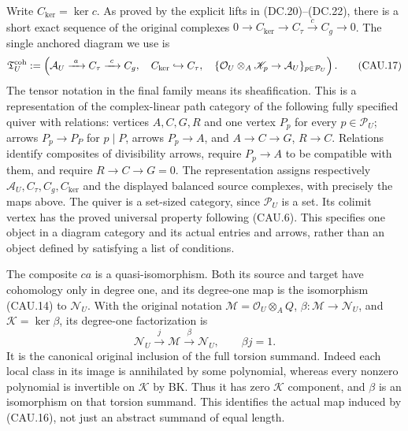 Write $C_{\ker}=\ker c$.  As proved by the explicit lifts in (DC.20)--(DC.22),
there is a short exact sequence of the original complexes
$0\to C_{\ker}\to C_\tau\xrightarrow c C_g\to0$.
The single anchored diagram we use is
\[
 \mathfrak T_U^{\rm coh}:=
 \left(
 \mathcal A_U\xrightarrow{\ a\ }C_\tau\xrightarrow{\ c\ }C_g,
 \quad C_{\ker}\hookrightarrow C_\tau,
 \quad \{\mathcal O_U\otimes_A\mathscr K_p\to\mathcal A_U\}_{p\in\mathcal P_U}
 \right).                                                    \tag{CAU.17}
\]
The tensor notation in the final family means its sheafification.
This is a representation of the complex-linear path category of the
following fully specified quiver with relations: vertices $A,C,G,R$
and one vertex $P_p$ for every
$p\in\mathcal P_U$; arrows $P_p\to P_P$ for $p\mid P$, arrows
$P_p\to A$, and $A\to C\to G$, $R\to C$.  Relations identify
composites of divisibility arrows, require $P_p\to A$ to be compatible
with them, and require $R\to C\to G=0$.  The representation assigns
respectively $\mathcal A_U,C_\tau,C_g,C_{\ker}$ and the displayed
balanced source complexes, with precisely the maps above.  The quiver
is a set-sized category, since $\mathcal P_U$ is a set.  Its colimit
vertex has the proved universal property following (CAU.6).  This
specifies one object in a diagram category and its actual entries and
arrows, rather than an object defined by satisfying a list of conditions.

The composite $ca$ is a quasi-isomorphism.  Both its source and target
have cohomology only in degree one, and its degree-one map is the
isomorphism (CAU.14) to $\mathcal N_U$.  With the original notation
$\mathcal M=\mathcal O_U\otimes_AQ$, $\beta:\mathcal M\to\mathcal N_U$,
and $\mathcal K=\ker\beta$, its degree-one factorization is
\[
 \mathcal N_U\xrightarrow{\ j\ }\mathcal M
                 \xrightarrow{\beta}\mathcal N_U,
 \qquad\beta j=1.                                           \tag{CAU.18}
\]
It is the canonical original inclusion of the full torsion summand.
Indeed each local class in its image is annihilated by some polynomial,
whereas every nonzero polynomial is invertible on $\mathcal K$ by BK.
Thus it has zero $\mathcal K$ component, and $\beta$ is an isomorphism
on that torsion summand.  This identifies the actual map induced by
(CAU.16), not just an abstract summand of equal length.

